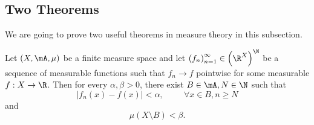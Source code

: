 \documentclass[pmath451]{subfiles}
\begin{document}
    \subsection{Two Theorems}
    
    We are going to prove two useful theorems in measure theory in this subsection.

    \begin{lemma}{}
        Let $\left( X,\mA,\mu \right)$ be a finite measure space and let $\left( f_{n} \right)^{\infty}_{n=1}\in \left( \R^{X} \right)^{\N}$ be a sequence of measurable functions such that $f_n\to f$ pointwise for some measurable $f:X\to\R$. Then for every $\alpha,\beta>0$, there exist $B\in\mA, N\in\N$ such that
        \begin{equation*}
            \left| f_n\left( x \right)-f\left( x \right) \right| < \alpha,\hspace{1cm}\forall x\in B,n\geq N
        \end{equation*}
        and
        \begin{equation*}
            \mu\left( X\setminus B \right) < \beta.
        \end{equation*}
    \end{lemma}
    
\end{document}
